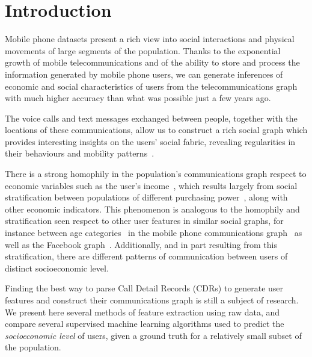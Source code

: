\section{Introduction}

Mobile phone datasets present a rich view into social interactions and physical movements of large segments of the population. Thanks to the exponential growth of mobile telecommunications and of the ability to store and process the information generated by mobile phone users, we can generate inferences of economic and social characteristics of users from the telecommunications graph with much higher accuracy than what was possible just a few years ago.

The voice calls and text messages exchanged between people, together with the locations of these communications, allow us to construct a rich social graph which provides interesting insights on the users' social fabric, revealing regularities in their behaviours and mobility patterns~\cite{gonzalez2008understanding,ponieman2013human,sarraute2015city}.

There is a strong homophily in the population's communications graph respect to economic variables such as the user's income~\cite{fixmanasonam2016}, 
which results largely from social stratification between populations of different purchasing power~\cite{leo2015socioeconomic}, along with other economic indicators.
This phenomenon is analogous to the homophily and stratification seen respect to other user features in similar social graphs, for instance between age categories~\cite{mcpherson2001birds} in the mobile phone communications graph~\cite{sarraute2014} as well as the Facebook graph~\cite{ugander2011anatomy}.
Additionally, and in part resulting from this stratification, there are different patterns of communication between users of distinct socioeconomic level. 

Finding the best way to parse Call Detail Records (CDRs) to generate user features and construct their communications graph is still a subject of research. 
We present here several methods of feature extraction using raw data, and compare several supervised machine learning algorithms used to predict the \emph{socioeconomic level} of users, given a ground truth for a relatively small subset of the population.
